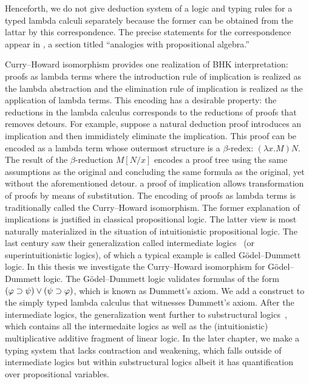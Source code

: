  Henceforth, we do not give deduction system of a logic and
 typing rules for a typed lambda calculi separately because
 the former can be obtained from the lattar by this correspondence.
The
precise statements for the correspondence appear in
\citet[9E]{curry1974combinatory}, a section titled ``analogies with
propositional algebra.''

Curry--Howard isomorphism provides
one realization of BHK interpretation: proofs as lambda terms where the
introduction rule of implication is realized as the lambda abstraction
and the elimination rule of implication is realized as the application
of lambda terms.
This encoding has a desirable property:
the reductions in the lambda calculus corresponds to the reductions of
proofs that
removes detours.
For example, suppose a natural deduction proof introduces an implication and then
immidiately eliminate the
implication.  This proof can be encoded as a lambda term whose outermost
structure is a $\beta$-redex: $(\lambda x. M)N$.
 The result of the $\beta$-reduction $M[N/x]$ encodes a proof tree using
 the same assumptions as the original and concluding the same formula as
 the original, yet without the aforementioned detour.
 a proof of implication allows transformation of proofs
by means of
substitution.  The encoding of proofs as lambda terms is traditionally
called the Curry--Howard isomorphism.
The former explanation of implications is justified in classical propositional logic.
The latter view is most naturally materialized in the situation of
intuitionistic propositional logic.  The last century saw their
generalization called intermediate logics~\citep{umezawa} (or superintuitionistic
logics), of which a typical example is
called G\"odel--Dummett logic.
In this thesis we investigate the Curry--Howard isomorphism for
G\"odel--Dummett logic.  The G\"odel--Dummett
logic validates formulas
of the form $(\varphi\supset\psi)\lor(\psi\supset\varphi)$, which is known as
Dummett's axiom.  We add a construct to the simply typed lambda
calculus
that witnesses Dummett's axiom.
After the intermediate logics, the generalization went further to
substructural
logics~\citep{residuated}, which contains all the intermedaite logics as
well as the
(intuitionistic) multiplicative
additive fragment of linear logic.
In the later chapter, we make a typing system that lacks contraction and
weakening, which falls outside of intermediate logics but within
substructural logics albeit it has quantification over propositional variables.

